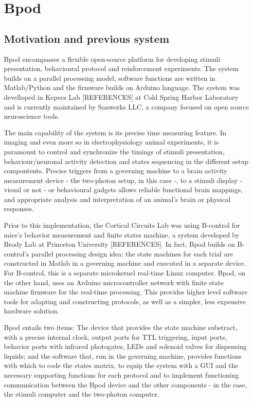 \section{Bpod}
\label{sec:sectionb}
\subsection{Motivation and previous system}
\label{subsec:subasectionB}

Bpod encompasses a flexible open-source platform for developing stimuli presentation, behavioural protocol and reinforcement experiments. The system builds on a parallel processing model, software functions are written in Matlab/Python and the firmware builds on Arduino language. The system was develloped in Kepecs Lab [REFERENCES] at Cold Spring Harbor Laboratory and is currently maintained by Sanworks LLC, a company focused on open source neuroscience tools.

The main capability of the system is its precise time measuring feature. In imaging and even more so in electrophysiology animal experiments, it is paramount to control and synchronize the timings of stimuli presentation, behaviour/neuronal activity detection and states sequencing in the different setup compontents. Precise triggers from a governing machine to a brain activity measurement device - the two-photon setup, in this case -, to a stimuli display - visual or not - or behavioural gadgets allows reliable functional brain mappings, and appropriate analysis and interpretation of an animal's brain or physical responses.


Prior to this implementation, the Cortical Circuits Lab was using B-control for mice's behavior measurement and finite states machine, a system developed by Brody Lab at Princeton University [REFERENCES]. In fact, Bpod builds on B-control's parallel processing design idea: the state machines for each trial are constructed in Matlab in a governing machine and executed in a separate device. For B-control, this is a separate microkernel real-time Linux computer. Bpod, on the other hand, uses an Arduino microcontroller network with finite state machine firmware for the real-time processing. This provides higher level software tools for adapting and constructing protocols, as well as a simpler, less expensive hardware solution.


Bpod entails two items: The device that provides the state machine substract, with a precise internal clock, output ports for TTL triggering, input ports, behavior ports with infrared photogates, LEDs and solenoid valves for dispensing liquids; and the software that, run in the governing machine, provides functions with which to code the states matrix, to equip the system with a GUI and the necessary supporting functions for each protocol and to implement functioning communication between the Bpod device and the other components - in  the case, the stimuli computer and the two-photon computer. 

